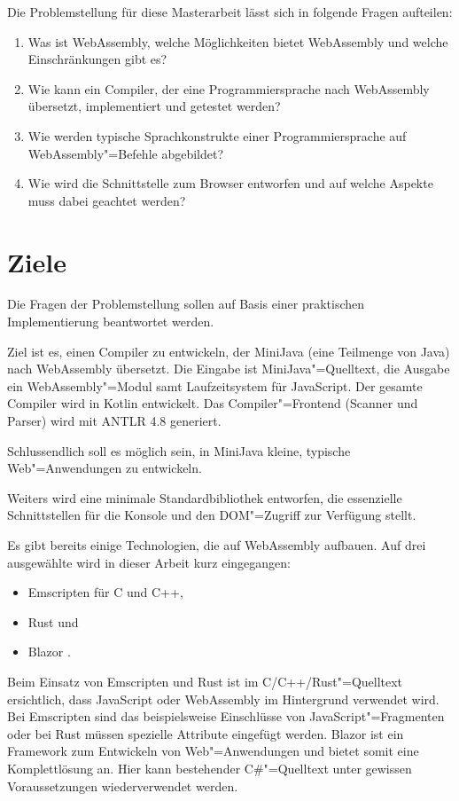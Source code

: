 Die Problemstellung für diese Masterarbeit lässt sich in folgende Fragen aufteilen:

\begin{enumerate}
	\item Was ist WebAssembly, welche Möglichkeiten bietet WebAssembly und welche Einschränkungen gibt es?
	\item Wie kann ein Compiler, der eine Programmiersprache nach WebAssembly übersetzt, implementiert und getestet werden?
	\item Wie werden typische Sprachkonstrukte einer Programmiersprache auf WebAssembly"=Befehle abgebildet?
	\item Wie wird die Schnittstelle zum Browser entworfen und auf welche Aspekte muss dabei geachtet werden?
\end{enumerate}

\section{Ziele}

Die Fragen der Problemstellung sollen auf Basis einer praktischen Implementierung beantwortet werden.

Ziel ist es, einen Compiler zu entwickeln, der MiniJava (eine Teilmenge von Java) nach WebAssembly übersetzt. Die Eingabe ist MiniJava"=Quelltext, die Ausgabe ein WebAssembly"=Modul samt Laufzeitsystem für JavaScript. Der gesamte Compiler wird in Kotlin entwickelt. Das Compiler"=Frontend (Scanner und Parser) wird mit ANTLR 4.8 generiert.

Schlussendlich soll es möglich sein, in MiniJava kleine, typische Web"=Anwendungen zu entwickeln.

Weiters wird eine minimale Standardbibliothek entworfen, die essenzielle Schnittstellen für die Konsole und den DOM"=Zugriff zur Verfügung stellt.

Es gibt bereits einige Technologien, die auf WebAssembly aufbauen. Auf drei ausgewählte wird in dieser Arbeit kurz eingegangen:
\begin{itemize}
    \item Emscripten \cite{Emscripten} für C und C++,
    \item Rust \cite{RustWasmWebsite} und
    \item Blazor \cite{Blazor}.
\end{itemize}

Beim Einsatz von Emscripten und Rust ist im C/C++/Rust"=Quelltext ersichtlich, dass JavaScript oder WebAssembly im Hintergrund verwendet wird. Bei Emscripten sind das beispielsweise Einschlüsse von JavaScript"=Fragmenten oder bei Rust müssen spezielle Attribute eingefügt werden. Blazor ist ein Framework zum Entwickeln von Web"=Anwendungen und bietet somit eine Komplettlösung an. Hier kann bestehender C\#{}"=Quelltext unter gewissen Voraussetzungen wiederverwendet werden.

